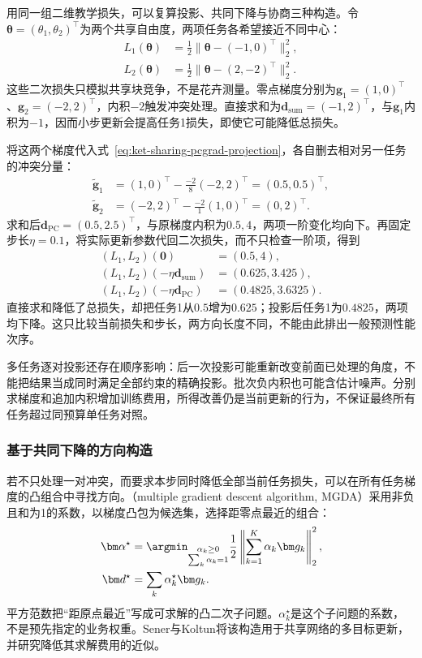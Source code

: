 用同一组二维教学损失，可以复算投影、共同下降与协商三种构造。令$\bm\theta=(\theta_1,\theta_2)^{\top}$为两个共享自由度，两项任务各希望接近不同中心：
\begin{align}
  L_1(\bm\theta)
    &=\tfrac12\|\bm\theta-(-1,0)^{\top}\|_2^2,
  \nonumber\\
  L_2(\bm\theta)
    &=\tfrac12\|\bm\theta-(2,-2)^{\top}\|_2^2.
  \label{eq:ket-sharing-toy-losses}
\end{align}
这些二次损失只模拟共享块竞争，不是花卉测量。零点梯度分别为$\bm g_1=(1,0)^{\top}$、$\bm g_2=(-2,2)^{\top}$，内积$-2$触发冲突处理。直接求和为$\bm d_{\mathrm{sum}}=(-1,2)^{\top}$，与$\bm g_1$内积为$-1$，因而小步更新会提高任务1损失，即使它可能降低总损失。

将这两个梯度代入式~\eqref{eq:ket-sharing-pcgrad-projection}，各自删去相对另一任务的冲突分量：
\begin{align}
  \widetilde{\bm g}_1
    &=(1,0)^{\top}-\frac{-2}{8}(-2,2)^{\top}
      =(0.5,0.5)^{\top},
  \nonumber\\
  \widetilde{\bm g}_2
    &=(-2,2)^{\top}-\frac{-2}{1}(1,0)^{\top}
      =(0,2)^{\top}.
\end{align}
求和后$\bm d_{\mathrm{PC}}=(0.5,2.5)^{\top}$，与原梯度内积为$0.5,4$，两项一阶变化均向下。再固定步长$\eta=0.1$，将实际更新参数代回二次损失，而不只检查一阶项，得到
\begin{align}
  (L_1,L_2)(\bm0)&=(0.5,4),
  \nonumber\\
  (L_1,L_2)(-\eta\bm d_{\mathrm{sum}})
    &=(0.625,3.425),
  \nonumber\\
  (L_1,L_2)(-\eta\bm d_{\mathrm{PC}})
    &=(0.4825,3.6325).
  \label{eq:ket-sharing-pcgrad-numbers}
\end{align}
直接求和降低了总损失，却把任务1从$0.5$增为$0.625$；投影后任务1为$0.4825$，两项均下降。这只比较当前损失和步长，两方向长度不同，不能由此排出一般预测性能次序。

多任务逐对投影还存在顺序影响：后一次投影可能重新改变前面已处理的角度，不能把结果当成同时满足全部约束的精确投影。批次负内积也可能含估计噪声。分别求梯度和追加内积增加训练费用，所得改善仍是当前更新的行为，不保证最终所有任务超过同预算单任务对照。

\subsubsection{基于共同下降的方向构造}
\label{sec:ket-sharing-mgda}

若不只处理一对冲突，而要求本步同时降低全部当前任务损失，可以在所有任务梯度的凸组合中寻找方向。（multiple gradient descent algorithm, MGDA）采用非负且和为1的系数，以梯度凸包为候选集，选择距零点最近的组合：
\begin{align}
  \bm\alpha^\star
  &=\argmin_{\substack{\alpha_k\geq0\\\sum_k\alpha_k=1}}
  \frac12\left\|\sum_{k=1}^{K}\alpha_k\bm g_k\right\|_2^2,
  \nonumber\\
  \bm d^\star&=\sum_k\alpha_k^\star\bm g_k.
  \label{eq:ket-sharing-mgda}
\end{align}
平方范数把“距原点最近”写成可求解的凸二次子问题。$\alpha_k^\star$是这个子问题的系数，不是预先指定的业务权重。Sener与Koltun将该构造用于共享网络的多目标更新，并研究降低其求解费用的近似。

